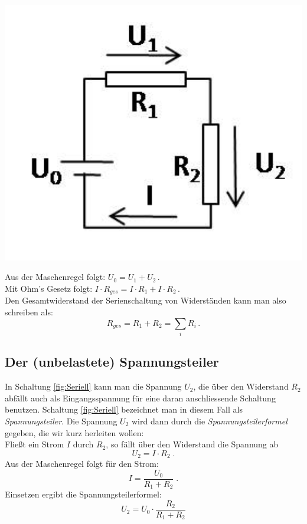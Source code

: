 \begin{minipage}{0.35\textwidth}
 \includegraphics[width=1.00\textwidth]{figures/Seriell.jpg}
 \label{fig:Seriell}
\end{minipage}
%
\begin{minipage}{0.6\textwidth}
Aus der Maschenregel folgt: \hfill $U_0 = U_1 + U_2\, .$\\
Mit Ohm's Gesetz folgt: \hfill $I\cdot R_{ges} = I\cdot R_1 + I\cdot R_2\, .$\\
Den Gesamtwiderstand der Serienschaltung von Widerständen kann man also schreiben als: 
\begin{equation}
R_{ges} = R_1 + R_2 = \sum_i{R_i} \, .
\end{equation}
\end{minipage}
%
\subsection{Der (unbelastete) Spannungsteiler} \label{sec:Spannungsteiler}

In Schaltung \ref{fig:Seriell} kann man die Spannung $U_2$, die über den Widerstand $R_2$ abfällt auch als Eingangsspannung für eine daran anschliessende Schaltung benutzen. Schaltung \ref{fig:Seriell} bezeichnet man in diesem Fall als \textit{Spannungsteiler}. Die Spannung $U_2$ wird dann durch die \textit{Spannungsteilerformel} gegeben, die wir kurz herleiten wollen:\\
Fließt ein Strom $I$ durch $R_2$, so fällt über den Widerstand die Spannung ab
\begin{equation*}
U_2 = I\cdot R_2\; .
\end{equation*}
Aus der Maschenregel folgt für den Strom:
\begin{equation*}
I = \frac{U_0}{R_1 + R_2} \; .
\end{equation*}
Einsetzen ergibt die Spannungsteilerformel:
\begin{equation}\label{eq:Spannungsteiler}
U_2 = U_0\cdot\frac{R_2}{R_1+R_2}
\end{equation}

